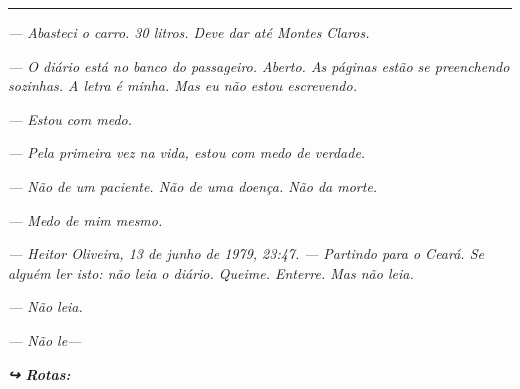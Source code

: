 \vspace{0.5em}\noindent\rule{\textwidth}{0.5pt}\vspace{0.5em}

\noindent \textit{--- Abasteci o carro. 30 litros. Deve dar até Montes Claros.}

\noindent \textit{--- O diário está no banco do passageiro. Aberto. As páginas estão se preenchendo sozinhas. A letra é minha. Mas eu não estou escrevendo.}

\noindent \textit{--- Estou com medo.}

\noindent \textit{--- Pela primeira vez na vida, estou com medo de verdade.}

\noindent \textit{--- Não de um paciente. Não de uma doença. Não da morte.}

\noindent \textit{--- Medo de mim mesmo.}

\noindent \textit{--- Heitor Oliveira, 13 de junho de 1979, 23:47.}
\textit{--- Partindo para o Ceará. Se alguém ler isto: não leia o diário. Queime. Enterre. Mas não leia.}

\noindent \textit{--- Não leia.}

\noindent \textit{--- Não le---}

\vspace{0.5em}
\noindent\textit{\textbf{↪ Rotas:}  \rotasep {} \rotasep {}}